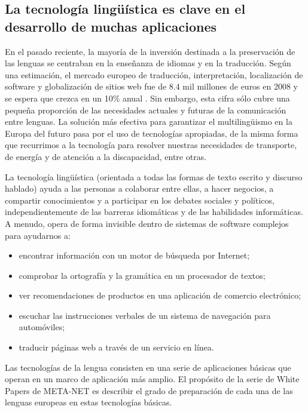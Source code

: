 \begin{multicols}{2}
\subsection{La tecnología lingüística es clave en el desarrollo de muchas aplicaciones}

En el pasado reciente, la mayoría de la inversión destinada a la preservación de las lenguas se centraban en la enseñanza de idiomas y en la traducción. Según una estimación, el mercado europeo de traducción, interpretación, localización de software y globalización de sitios web fue de 8.4 mil millones de euros en 2008 y se espera que crezca en un 10\% anual \cite{EC3}.    Sin embargo, esta cifra sólo cubre una pequeña proporción de las necesidades actuales y futuras de la comunicación entre lenguas. La solución más efectiva para garantizar el multilingüismo en la Europa del futuro pasa por el uso de tecnologías apropiadas, de la misma forma que recurrimos a la tecnología para resolver nuestras necesidades de transporte, de energía y de atención a la discapacidad, entre otras.

La tecnología lingüística (orientada a todas las formas de texto escrito y discurso hablado) ayuda a las personas a colaborar entre ellas, a hacer negocios, a compartir conocimientos y a participar en los debates sociales y políticos, independientemente de las barreras idiomáticas y de las habilidades informáticas. A menudo, opera de forma invisible dentro de sistemas de software complejos para ayudarnos a:

\begin{itemize}
  \item	encontrar información con un motor de búsqueda por Internet;
  \item	comprobar la ortografía y la gramática en un procesador de textos;
  \item	ver recomendaciones de productos en una aplicación de comercio electrónico;
  \item	escuchar las instrucciones verbales de un sistema de navegación para automóviles;
  \item	traducir páginas web a través de un servicio en línea. 
\end{itemize}

Las tecnologías de la lengua consisten en una serie de aplicaciones básicas que operan en un marco de aplicación más amplio. El propósito de la serie de White Papers de META-NET es describir el grado de preparación de cada una de las lenguas europeas en estas tecnologías básicas. 


\end{multicols}
